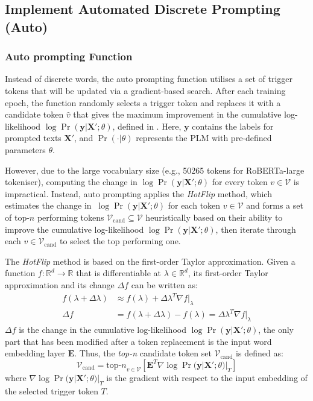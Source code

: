 \subsection{Implement Automated Discrete Prompting (Auto)}
\subsubsection{Auto prompting Function} \label{sec:auto-prompt}
Instead of discrete words, the auto prompting function utilises a set of trigger tokens that will be updated via a gradient-based search. After each training epoch, the function randomly selects a trigger token and replaces it with a candidate token $\hat{v}$ that gives the maximum improvement in the cumulative log-likelihood $\log \Pr(\mathbf{y} | \mathbf{X}'; \theta)$, defined in . Here, $\mathbf{y}$ contains the labels for prompted texts $\mathbf{X}'$, and $\Pr(\cdot|\theta)$ represents the PLM with pre-defined parameters $\theta$.

However, due to the large vocabulary size (e.g., 50265 tokens for RoBERTa-large tokeniser), computing the change in $\log \Pr(\mathbf{y} | \mathbf{X}'; \theta)$ for every token $v \in \mathcal{V}$ is impractical. Instead, auto prompting applies the \emph{HotFlip} \cite{Ebrahimi17HotFlip} method, which estimates the change in $\ \log \Pr(\mathbf{y} | \mathbf{X}'; \theta)$ for each token $v \in \mathcal{V}$ and forms a set of top-$n$ performing tokens $\mathcal{V}_{\text{cand}} \subseteq \mathcal{V}$ heuristically based on their ability to improve the cumulative log-likelihood $\log \Pr(\mathbf{y} | \mathbf{X}'; \theta)$, then iterate through each $v \in \mathcal{V}_{\text{cand}}$ to select the top performing one.

The \emph{HotFlip} method is based on the first-order Taylor approximation. Given a function $f: \mathbb{R}^d \to \mathbb{R}$ that is differentiable at $\lambda \in \mathbb{R}^d$, its first-order Taylor approximation and its change $\Delta f$ can be written as:
\begin{equation}
\begin{split}
    f(\lambda + \Delta \lambda) & \approx f(\lambda) + \Delta \lambda^T \nabla f|_{\lambda} \\
    \Delta f & = f(\lambda + \Delta \lambda) - f(\lambda) = \Delta \lambda^T \nabla f|_{\lambda}
\end{split}
\end{equation} 
$\Delta f$ is the change in the cumulative log-likelihood $\log \Pr(\mathbf{y} | \mathbf{X}'; \theta)$, the only part that has been modified after a token replacement is the input word embedding layer $\textbf{E}$. Thus, the \emph{top-n} candidate token set $\mathcal{V}_\text{cand}$ is defined as:
\begin{equation}
    \mathcal{V}_{\text{cand}} = {\text{top-}n}_{v\in \mathcal{V}} [\mathbf{E}^T \nabla \log \Pr(\mathbf{y} | \mathbf{X}'; \theta)|_{T}]
\end{equation}
where $\nabla \log \Pr(\mathbf{y} | \mathbf{X}'; \theta)|_T$ is the gradient with respect to the input embedding of the selected trigger token $T$.

